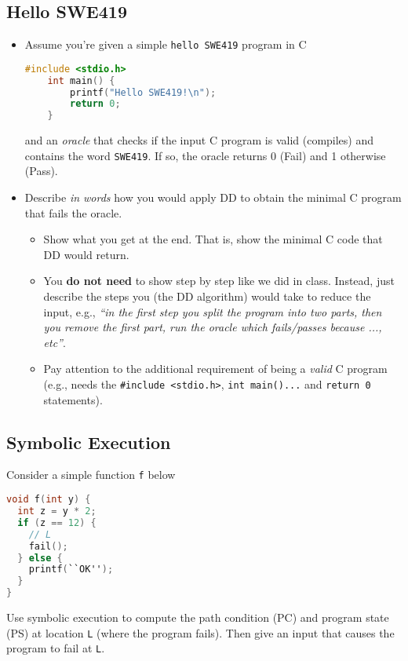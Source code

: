 \documentclass[oneside,11pt,dvipsnames]{book}
\newcommand{\code}[1]{\texttt{#1}}
\begin{document}
\subsection{Hello SWE419}
\begin{itemize}
    \item Assume you're given a simple \code{hello SWE419} program in C
    \begin{lstlisting}[language=C]
    #include <stdio.h>
    int main() {
        printf("Hello SWE419!\n");
        return 0;
    }
    \end{lstlisting}
    and an \emph{oracle} that checks if the input C program is valid (compiles) and contains the word \code{SWE419}. If so, the oracle returns 0 (Fail) and 1 otherwise (Pass).
    \item Describe \emph{in words} how you would apply DD to obtain the minimal C program that fails the oracle.
    \begin{itemize}
        \item Show what you get at the end. That is, show the minimal C code that DD would return.  
        \item You \textbf{do not need} to show step by step like we did in class. Instead, just describe the steps you (the DD algorithm) would take to reduce the input,  e.g., \emph{``in the first step you split the program into two parts, then you remove the first part, run the oracle which fails/passes because ..., etc''}.
        \item Pay attention to the additional requirement of being a \emph{valid} C program (e.g., needs the \code{\#include <stdio.h>}, \code{int main()...} and \code{return 0} statements). 
    \end{itemize}    
\end{itemize}

\subsection{Symbolic Execution}\label{exercise:symbolic-execution}

Consider a simple function \code{f} below 

\begin{lstlisting}[language=C]
void f(int y) {
  int z = y * 2;
  if (z == 12) {
    // L
    fail();
  } else {
    printf(``OK'');
  }
}
\end{lstlisting}

Use symbolic execution to compute the path condition (PC) and program state (PS) at location \code{L} (where the program fails). Then give an input that causes the program to fail at \code{L}.
\end{document}
